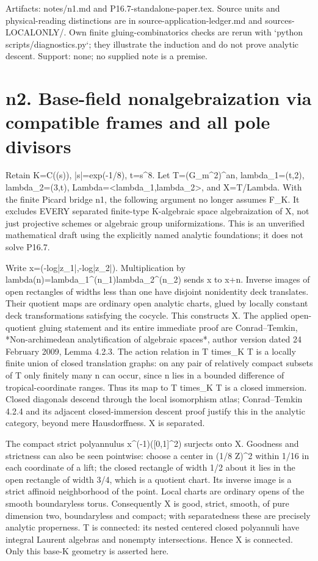 \documentclass[11pt]{article}
\begin{document}
Artifacts: notes/n1.md and P16.7-standalone-paper.tex. Source units and physical-reading distinctions are in source-application-ledger.md and sources-LOCALONLY/. Own finite gluing-combinatorics checks are rerun with `python scripts/diagnostics.py`; they illustrate the induction and do not prove analytic descent. Support: none; no supplied note is a premise.


\section{n2. Base-field nonalgebraization via compatible frames and all pole divisors}

Retain K=C((s)), |s|=exp(-1/8), t=s\textasciicircum{}8. Let T=(G\_m\textasciicircum{}2)\textasciicircum{}an, lambda\_1=(t,2), lambda\_2=(3,t), Lambda=<lambda\_1,lambda\_2>, and X=T/Lambda. With the finite Picard bridge n1, the following argument no longer assumes F\_K. It excludes EVERY separated finite-type K-algebraic space algebraization of X, not just projective schemes or algebraic group uniformizations. This is an unverified mathematical draft using the explicitly named analytic foundations; it does not solve P16.7.

Write x=(-log|z\_1|,-log|z\_2|). Multiplication by lambda(n)=lambda\_1\textasciicircum{}(n\_1)lambda\_2\textasciicircum{}(n\_2) sends x to x+n. Inverse images of open rectangles of widths less than one have disjoint nonidentity deck translates. Their quotient maps are ordinary open analytic charts, glued by locally constant deck transformations satisfying the cocycle. This constructs X. The applied open-quotient gluing statement and its entire immediate proof are Conrad--Temkin, *Non-archimedean analytification of algebraic spaces*, author version dated 24 February 2009, Lemma 4.2.3. The action relation in T times\_K T is a locally finite union of closed translation graphs: on any pair of relatively compact subsets of T only finitely many n can occur, since n lies in a bounded difference of tropical-coordinate ranges. Thus its map to T times\_K T is a closed immersion. Closed diagonals descend through the local isomorphism atlas; Conrad--Temkin 4.2.4 and its adjacent closed-immersion descent proof justify this in the analytic category, beyond mere Hausdorffness. X is separated.

The compact strict polyannulus x\textasciicircum{}(-1)([0,1]\textasciicircum{}2) surjects onto X. Goodness and strictness can also be seen pointwise: choose a center in (1/8 Z)\textasciicircum{}2 within 1/16 in each coordinate of a lift; the closed rectangle of width 1/2 about it lies in the open rectangle of width 3/4, which is a quotient chart. Its inverse image is a strict affinoid neighborhood of the point. Local charts are ordinary opens of the smooth boundaryless torus. Consequently X is good, strict, smooth, of pure dimension two, boundaryless and compact; with separatedness these are precisely analytic properness. T is connected: its nested centered closed polyannuli have integral Laurent algebras and nonempty intersections. Hence X is connected. Only this base-K geometry is asserted here.
\end{document}
